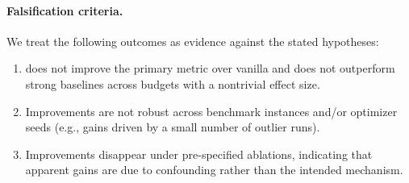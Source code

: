 \paragraph{Falsification criteria.}
We treat the following outcomes as evidence against the stated hypotheses:
\begin{enumerate}
    \item \ProposedMethodName{} does not improve the primary metric over vanilla \BackboneName{} and does not outperform strong baselines
    across budgets with a nontrivial effect size.
    \item Improvements are not robust across benchmark instances and/or optimizer seeds (e.g., gains driven by a small number of outlier runs).
    \item Improvements disappear under pre-specified ablations, indicating that apparent gains are due to confounding rather than the intended mechanism.
\end{enumerate}
